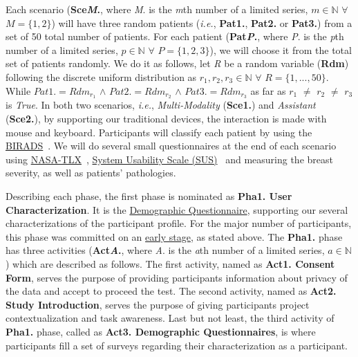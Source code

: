 Each scenario (\textbf{Sce\textit{M}.}, where \textit{M}. is the \textit{m}th number of a limited series, $m \in \mathbb{N}$ $\forall$ $M = \{1, 2\}$) will have three random patients (\textit{i.e.}, \textbf{Pat1.}, \textbf{Pat2.} or \textbf{Pat3.}) from a set of 50 total number of patients. For each patient (\textbf{Pat\textit{P}.}, where \textit{P}. is the \textit{p}th number of a limited series, $p \in \mathbb{N}$ $\forall$ $P = \{1, 2, 3\}$), we will choose it from the total set of patients randomly. We do it as follows, let \textit{R} be a random variable (\textbf{Rdm}) following the discrete uniform distribution as $r_{1}, r_{2}, r_{3} \in \mathbb{N}$ $\forall$ $R = \{1, ..., 50\}$. While $Pat1. = Rdm_{r_{1}}$ $\wedge$ $Pat2. = Rdm_{r_{2}}$ $\wedge$ $Pat3. = Rdm_{r_{3}}$ as far as $r_{1}$ $\neq$ $r_{2}$ $\neq$ $r_{3}$ is \textit{True}. In both two scenarios, \textit{i.e.}, \textit{Multi-Modality} (\textbf{Sce1.}) and \textit{Assistant} (\textbf{Sce2.}), by supporting our traditional devices, the interaction is made with mouse and keyboard. Participants will classify each patient by using the \hyperlink{https://en.wikipedia.org/wiki/BI-RADS}{BIRADS}~\cite{balleyguier2007birads}. We will do several small questionnaires at the end of each scenario using \hyperlink{https://en.wikipedia.org/wiki/NASA-TLX}{NASA-TLX}~\cite{ramkumar2017using}, \hyperlink{https://en.wikipedia.org/wiki/System_usability_scale}{System Usability Scale (SUS)}~\cite{orfanou2015perceived} and measuring the breast severity, as well as patients' pathologies.

Describing each phase, the first phase is nominated as \textbf{Pha1. User Characterization}. It is the \hyperlink{https://docs.google.com/spreadsheets/d/1h-4neEo3RbYsJs3JHBGvogHCvz3UFnMvsmoernfCuDU/edit?usp=sharing}{Demographic Questionnaire}, supporting our several characterizations of the participant profile. For the major number of participants, this phase was committed on an \hyperlink{https://github.com/MIMBCD-UI/testing-guide-breast/tree/master/samples/test_4}{early stage}, as stated above. The \textbf{Pha1.} phase has three activities (\textbf{Act\textit{A}.}, where \textit{A}. is the \textit{a}th number of a limited series, $a \in \mathbb{N}$) which are described as follows. The first activity, named as \textbf{Act1. Consent Form}, serves the purpose of providing participants information about privacy of the data and accept to proceed the test. The second activity, named as \textbf{Act2. Study Introduction}, serves the purpose of giving participants project contextualization and task awareness. Last but not least, the third activity of \textbf{Pha1.} phase, called as \textbf{Act3. Demographic Questionnaires}, is where participants fill a set of surveys regarding their characterization as a participant.

